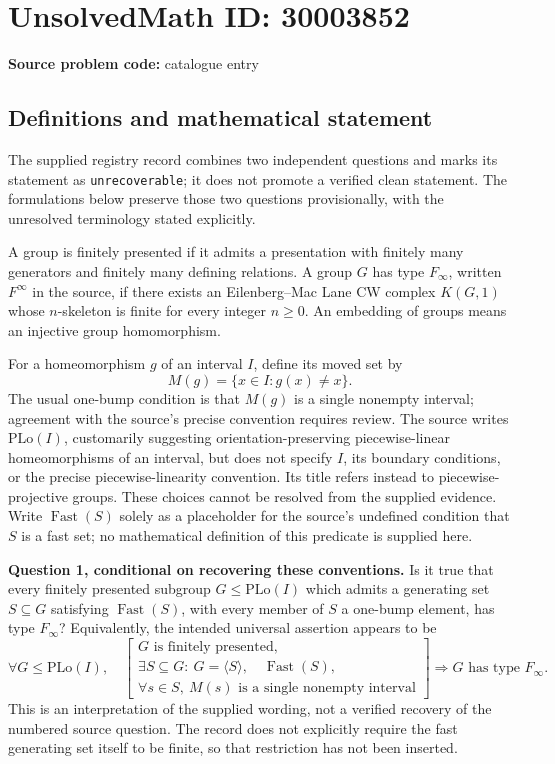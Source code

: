 \documentclass[11pt]{article}
\begin{document}
\section*{UnsolvedMath ID: 30003852}
\textbf{Source problem code:} catalogue entry
\subsection{Definitions and mathematical statement}
The supplied registry record combines two independent questions and marks its statement as \texttt{unrecoverable}; it does not promote a verified clean statement. The formulations below preserve those two questions provisionally, with the unresolved terminology stated explicitly.

A group is finitely presented if it admits a presentation with finitely many generators and finitely many defining relations. A group \(G\) has type \(F_\infty\), written \(F^{\infty}\) in the source, if there exists an Eilenberg--Mac Lane CW complex \(K(G,1)\) whose \(n\)-skeleton is finite for every integer \(n\geq 0\). An embedding of groups means an injective group homomorphism.

For a homeomorphism \(g\) of an interval \(I\), define its moved set by
\[
M(g)=\{x\in I:g(x)\neq x\}.
\]
The usual one-bump condition is that \(M(g)\) is a single nonempty interval; agreement with the source's precise convention requires review. The source writes \(\mathrm{PLo}(I)\), customarily suggesting orientation-preserving piecewise-linear homeomorphisms of an interval, but does not specify \(I\), its boundary conditions, or the precise piecewise-linearity convention. Its title refers instead to piecewise-projective groups. These choices cannot be resolved from the supplied evidence. Write \(\operatorname{Fast}(S)\) solely as a placeholder for the source's undefined condition that \(S\) is a fast set; no mathematical definition of this predicate is supplied here.

\textbf{Question 1, conditional on recovering these conventions.} Is it true that every finitely presented subgroup \(G\leq\mathrm{PLo}(I)\) which admits a generating set \(S\subseteq G\) satisfying \(\operatorname{Fast}(S)\), with every member of \(S\) a one-bump element, has type \(F_\infty\)? Equivalently, the intended universal assertion appears to be
\[
\forall G\leq\mathrm{PLo}(I),\quad
\left[
\begin{gathered}
G\text{ is finitely presented},\\
\exists S\subseteq G:\ G=\langle S\rangle,\quad
\operatorname{Fast}(S),\\
\forall s\in S,\ M(s)\text{ is a single nonempty interval}
\end{gathered}
\right]
\Longrightarrow G\text{ has type }F_\infty.
\]
This is an interpretation of the supplied wording, not a verified recovery of the numbered source question. The record does not explicitly require the fast generating set itself to be finite, so that restriction has not been inserted.
\end{document}
